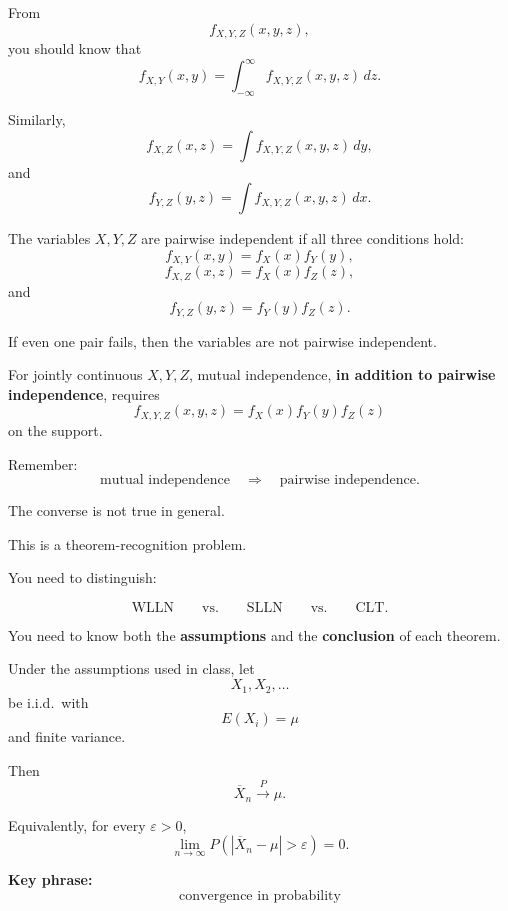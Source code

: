 \documentclass[11pt]{article}
\begin{document}
\begin{toolbox}

From
\[
f_{X,Y,Z}(x,y,z),
\]
you should know that
\[
f_{X,Y}(x,y)
=
\int_{-\infty}^{\infty}
f_{X,Y,Z}(x,y,z)\,dz.
\]

Similarly,
\[
f_{X,Z}(x,z)
=
\int
f_{X,Y,Z}(x,y,z)\,dy,
\]
and
\[
f_{Y,Z}(y,z)
=
\int
f_{X,Y,Z}(x,y,z)\,dx.
\]
\end{toolbox}

\begin{toolbox}

The variables \(X,Y,Z\) are pairwise independent if all three conditions
hold:
\[
f_{X,Y}(x,y)=f_X(x)f_Y(y),
\]
\[
f_{X,Z}(x,z)=f_X(x)f_Z(z),
\]
and
\[
f_{Y,Z}(y,z)=f_Y(y)f_Z(z).
\]

If even one pair fails, then the variables are not pairwise independent.
\end{toolbox}

\begin{toolbox}

For jointly continuous \(X,Y,Z\), mutual independence, \textbf{in addition to pairwise independence}, requires
\[
f_{X,Y,Z}(x,y,z)
=
f_X(x)f_Y(y)f_Z(z)
\]
on the support.

Remember:
\[
\text{mutual independence}
\quad\Longrightarrow\quad
\text{pairwise independence}.
\]

The converse is not true in general.
\end{toolbox}



\newpage

\begin{topicbox}

This is a theorem-recognition problem.

You need to distinguish:

\[
\text{WLLN}
\qquad
\text{vs.}
\qquad
\text{SLLN}
\qquad
\text{vs.}
\qquad
\text{CLT}.
\]

You need to know both the \textbf{assumptions} and the \textbf{conclusion} of
each theorem.
\end{topicbox}

\begin{toolbox}

Under the assumptions used in class, let
\[
X_1,X_2,\dots
\]
be i.i.d.\ with
\[
E(X_i)=\mu
\]
and finite variance.

Then
\[
\overline X_n\xrightarrow{P}\mu.
\]

Equivalently, for every \(\varepsilon>0\),
\[
\lim_{n\to\infty}
P\left(
|\overline X_n-\mu|>\varepsilon
\right)
=
0.
\]

\textbf{Key phrase:}
\[
\boxed{\text{convergence in probability}}
\]
\end{toolbox}
\end{document}
